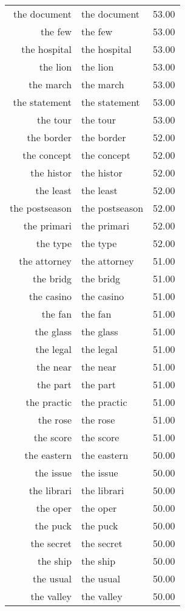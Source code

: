 \begin{table}[ht]
\begin{tabular}{rlr}
  the document & the document & 53.00 \\ 
  the few & the few & 53.00 \\ 
  the hospital & the hospital & 53.00 \\ 
  the lion & the lion & 53.00 \\ 
  the march & the march & 53.00 \\ 
  the statement & the statement & 53.00 \\ 
  the tour & the tour & 53.00 \\ 
  the border & the border & 52.00 \\ 
  the concept & the concept & 52.00 \\ 
  the histor & the histor & 52.00 \\ 
  the least & the least & 52.00 \\ 
  the postseason & the postseason & 52.00 \\ 
  the primari & the primari & 52.00 \\ 
  the type & the type & 52.00 \\ 
  the attorney & the attorney & 51.00 \\ 
  the bridg & the bridg & 51.00 \\ 
  the casino & the casino & 51.00 \\ 
  the fan & the fan & 51.00 \\ 
  the glass & the glass & 51.00 \\ 
  the legal & the legal & 51.00 \\ 
  the near & the near & 51.00 \\ 
  the part & the part & 51.00 \\ 
  the practic & the practic & 51.00 \\ 
  the rose & the rose & 51.00 \\ 
  the score & the score & 51.00 \\ 
  the eastern & the eastern & 50.00 \\ 
  the issue & the issue & 50.00 \\ 
  the librari & the librari & 50.00 \\ 
  the oper & the oper & 50.00 \\ 
  the puck & the puck & 50.00 \\ 
  the secret & the secret & 50.00 \\ 
  the ship & the ship & 50.00 \\ 
  the usual & the usual & 50.00 \\ 
  the valley & the valley & 50.00 \\ 

\end{tabular}
\end{table}
